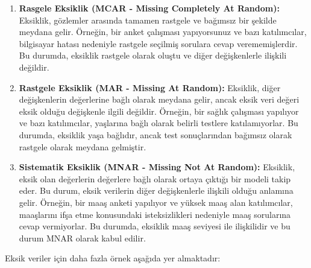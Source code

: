 \documentclass[
  letterpaper,
  DIV=11,
  numbers=noendperiod]{scrreprt}
\begin{document}
\begin{enumerate}
\def\labelenumi{\arabic{enumi}.}
\item
  \textbf{Rasgele Eksiklik (MCAR - Missing Completely At Random):}
  Eksiklik, gözlemler arasında tamamen rastgele ve bağımsız bir şekilde
  meydana gelir. Örneğin, bir anket çalışması yapıyorsunuz ve bazı
  katılımcılar, bilgisayar hatası nedeniyle rastgele seçilmiş sorulara
  cevap verememişlerdir. Bu durumda, eksiklik rastgele olarak oluştu ve
  diğer değişkenlerle ilişkili değildir.
\item
  \textbf{Rastgele Eksiklik (MAR - Missing At Random):} Eksiklik, diğer
  değişkenlerin değerlerine bağlı olarak meydana gelir, ancak eksik veri
  değeri eksik olduğu değişkenle ilgili değildir. Örneğin, bir sağlık
  çalışması yapılıyor ve bazı katılımcılar, yaşlarına bağlı olarak
  belirli testlere katılamıyorlar. Bu durumda, eksiklik yaşa bağlıdır,
  ancak test sonuçlarından bağımsız olarak rastgele olarak meydana
  gelmiştir.
\item
  \textbf{Sistematik Eksiklik (MNAR - Missing Not At Random):} Eksiklik,
  eksik olan değerlerin değerlere bağlı olarak ortaya çıktığı bir modeli
  takip eder. Bu durum, eksik verilerin diğer değişkenlerle ilişkili
  olduğu anlamına gelir. Örneğin, bir maaş anketi yapılıyor ve yüksek
  maaş alan katılımcılar, maaşlarını ifşa etme konusundaki
  isteksizlikleri nedeniyle maaş sorularına cevap vermiyorlar. Bu
  durumda, eksiklik maaş seviyesi ile ilişkilidir ve bu durum MNAR
  olarak kabul edilir.
\end{enumerate}

Eksik veriler için daha fazla örnek aşağıda yer almaktadır:
\end{document}
